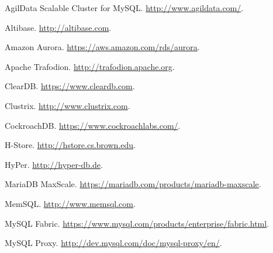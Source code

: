 \documentclass[a4paper,11pt,twoside,openright]{article}
\begin{document}
\begin{enumerate}[label={[}\arabic*{]}]
\item AgilData Scalable Cluster for MySQL.
\url{http://www.agildata.com/}.

\item Altibase. \url{http://altibase.com}.

\item Amazon Aurora. \url{https://aws.amazon.com/rds/aurora}.
\item
  Apache Trafodion. \url{http://trafodion.apache.org}.
\item
  ClearDB. \url{https://www.cleardb.com}.
\item
  Clustrix. \url{http://www.clustrix.com}.
\item
  CockroachDB. \url{https://www.cockroachlabs.com/}.
\item
  H-Store. \url{http://hstore.cs.brown.edu}.
\item
  HyPer. \url{http://hyper-db.de}.
\item MariaDB MaxScale. \url{https://mariadb.com/products/mariadb-maxscale}.
\item MemSQL. \url{http://www.memsql.com}.

\item MySQL Fabric. \url{https://www.mysql.com/products/enterprise/fabric.html}.
\item MySQL Proxy.
\url{http://dev.mysql.com/doc/mysql-proxy/en/}.


\end{enumerate}
\end{document}
